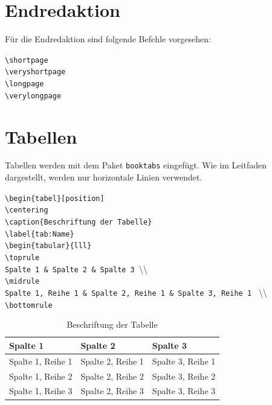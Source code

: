 \section{Endredaktion}
\label{sec:endredaktion}

Für die Endredaktion sind folgende Befehle vorgesehen:

\begin{syntax}
\verb|\shortpage|\\
\verb|\veryshortpage|\\
\verb|\longpage|\\
\verb|\verylongpage|
\end{syntax}

\section{Tabellen}

Tabellen werden mit dem Paket \verb|booktabs| eingefügt. Wie im Leitfaden dargestellt, werden nur horizontale Linien verwendet.

\begin{syntax}
\verb|\begin{tabel}[position]|\\
\verb|\centering|\\
\verb|\caption{Beschriftung der Tabelle}|\\
\verb|\label{tab:Name}|\\
\verb|\begin{tabular}{lll}|\\
\verb|\toprule|\\
\verb|Spalte 1 & Spalte 2 & Spalte 3 |\textbackslash\textbackslash \\
\verb|\midrule|\\
\verb|Spalte 1, Reihe 1 & Spalte 2, Reihe 1 & Spalte 3, Reihe 1 | \textbackslash\textbackslash \\
\verb|\bottomrule|
\end{syntax}

\begin{table}[htb]
	\centering
	\caption{Beschriftung der Tabelle}
	\label{tab:label-der-tabelle}
	\begin{tabular}{lll}
		\toprule
		Spalte 1 & Spalte 2 & Spalte 3 \\
		\midrule
		Spalte 1, Reihe 1 & Spalte 2, Reihe 1 & Spalte 3, Reihe 1 \\
		Spalte 1, Reihe 2 & Spalte 2, Reihe 2 & Spalte 3, Reihe 2 \\
		Spalte 1, Reihe 3 & Spalte 2, Reihe 3 & Spalte 3, Reihe 3 \\
		\bottomrule
	\end{tabular}
\end{table}

